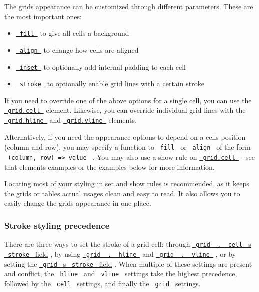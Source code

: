 The grid\textquotesingle s appearance can be customized through
different parameters. These are the most important ones:

\begin{itemize}
\tightlist
\item
  \href{/docs/reference/layout/grid/\#parameters-fill}{\texttt{\ fill\ }}
  to give all cells a background
\item
  \href{/docs/reference/layout/grid/\#parameters-align}{\texttt{\ align\ }}
  to change how cells are aligned
\item
  \href{/docs/reference/layout/grid/\#parameters-inset}{\texttt{\ inset\ }}
  to optionally add internal padding to each cell
\item
  \href{/docs/reference/layout/grid/\#parameters-stroke}{\texttt{\ stroke\ }}
  to optionally enable grid lines with a certain stroke
\end{itemize}

If you need to override one of the above options for a single cell, you
can use the
\href{/docs/reference/layout/grid/\#definitions-cell}{\texttt{\ grid.cell\ }}
element. Likewise, you can override individual grid lines with the
\href{/docs/reference/layout/grid/\#definitions-hline}{\texttt{\ grid.hline\ }}
and
\href{/docs/reference/layout/grid/\#definitions-vline}{\texttt{\ grid.vline\ }}
elements.

Alternatively, if you need the appearance options to depend on a
cell\textquotesingle s position (column and row), you may specify a
function to \texttt{\ fill\ } or \texttt{\ align\ } of the form
\texttt{\ (column,\ row)\ =\textgreater{}\ value\ } . You may also use a
show rule on
\href{/docs/reference/layout/grid/\#definitions-cell}{\texttt{\ grid.cell\ }}
- see that element\textquotesingle s examples or the examples below for
more information.

Locating most of your styling in set and show rules is recommended, as
it keeps the grid\textquotesingle s or table\textquotesingle s actual
usages clean and easy to read. It also allows you to easily change the
grid\textquotesingle s appearance in one place.

\subsubsection{Stroke styling
precedence}\label{stroke-styling-precedence}

There are three ways to set the stroke of a grid cell: through
\href{/docs/reference/layout/grid/\#definitions-cell-stroke}{\texttt{\ grid\ }{\texttt{\ .\ }}\texttt{\ cell\ }
\textquotesingle s \texttt{\ stroke\ } field} , by using
\href{/docs/reference/layout/grid/\#definitions-hline}{\texttt{\ grid\ }{\texttt{\ .\ }}\texttt{\ hline\ }}
and
\href{/docs/reference/layout/grid/\#definitions-vline}{\texttt{\ grid\ }{\texttt{\ .\ }}\texttt{\ vline\ }}
, or by setting the
\href{/docs/reference/layout/grid/\#parameters-stroke}{\texttt{\ grid\ }
\textquotesingle s \texttt{\ stroke\ } field} . When multiple of these
settings are present and conflict, the \texttt{\ hline\ } and
\texttt{\ vline\ } settings take the highest precedence, followed by the
\texttt{\ cell\ } settings, and finally the \texttt{\ grid\ } settings.


